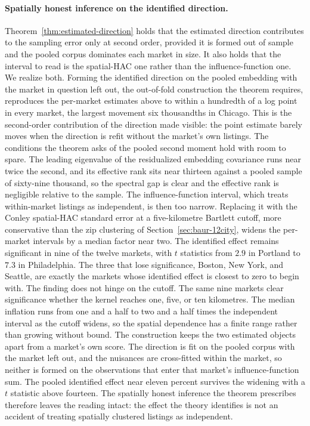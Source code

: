 \paragraph{Spatially honest inference on the identified direction.}
Theorem~\ref{thm:estimated-direction} holds that the estimated direction contributes
to the sampling error only at second order, provided it is formed out of sample and
the pooled corpus dominates each market in size. It also holds that the interval to read is the
spatial-HAC one rather than the influence-function one. We realize both. Forming the
identified direction on the pooled embedding with the market in question left out, the
out-of-fold construction the theorem requires, reproduces the per-market estimates
above to within a hundredth of a log point in every market, the largest movement six
thousandths in Chicago. This is the second-order contribution of the direction made
visible: the point estimate barely moves when the direction is refit without the
market's own listings. The conditions the theorem asks of the pooled second moment
hold with room to spare. The leading eigenvalue of the residualized embedding
covariance runs near twice the second, and its effective rank sits near thirteen against
a pooled sample of sixty-nine thousand, so the spectral gap is clear and the effective
rank is negligible relative to the sample. The influence-function interval,
which treats within-market listings as independent, is then too narrow. Replacing it
with the Conley spatial-HAC standard error at a five-kilometre Bartlett cutoff, more
conservative than the zip clustering of Section~\ref{sec:baur-12city}, widens the
per-market intervals by a median factor near two. The identified effect remains
significant in nine of the twelve markets, with $t$ statistics from $2.9$ in Portland
to $7.3$ in Philadelphia. The three that lose significance, Boston, New York, and
Seattle, are exactly the markets whose identified effect is closest to zero to begin
with. The finding does not hinge on the cutoff. The same nine markets clear
significance whether the kernel reaches one, five, or ten kilometres. The median
inflation runs from one and a half to two and a half times the independent interval as
the cutoff widens, so the spatial dependence has a finite range rather than growing
without bound. The construction keeps the two estimated objects apart from a market's
own score. The direction is fit on the pooled corpus with the market left out, and the
nuisances are cross-fitted within the market, so neither is formed on the observations
that enter that market's influence-function sum. The pooled identified effect near eleven percent survives the widening with a
$t$ statistic above fourteen. The spatially honest inference the theorem prescribes
therefore leaves the reading intact: the effect the theory identifies is not an
accident of treating spatially clustered listings as independent.
